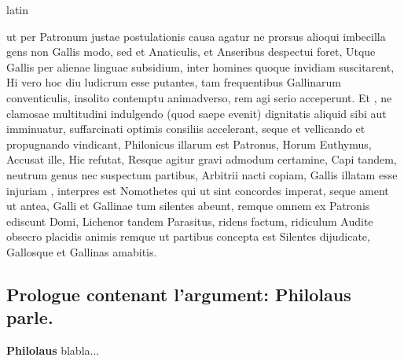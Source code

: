 \documentclass[12pt]{book}
\renewenvironment{latin}
    	{\begin{hyphenrules}{latin}}
    	{\end{hyphenrules}}
\begin{document}
\begin{pages}
\begin{latin}
\begin{Leftside}
            ut per Patronum justae postulationis causa agatur ne prorsus alioqui imbecilla gens non Gallis modo, 
            sed et Anaticulis, et Anseribus despectui foret, 
            Utque Gallis per alienae linguae subsidium, inter homines quoque invidiam suscitarent, 
            Hi vero hoc diu ludicrum esse putantes, tam frequentibus Gallinarum conventiculis, 
             insolito contemptu animadverso, rem agi serio acceperunt.  
            Et , 
            ne clamosae multitudini indulgendo (quod saepe evenit) dignitatis aliquid sibi aut  imminuatur, 
            suffarcinati optimis consiliis accelerant, seque et vellicando et propugnando vindicant, 
            Philonicus illarum  est Patronus, 
            Horum  Euthymus,  
            Accusat ille, Hic refutat,  
            Resque agitur gravi admodum certamine, 
            Capi tandem, neutrum genus nec suspectum partibus, 
            Arbitrii nacti copiam, Gallis illatam esse injuriam ,  
            interpres est Nomothetes  
            qui ut sint concordes imperat, seque ament ut antea, Galli et Gallinae tum silentes abeunt, 
            remque omnem ex Patronis ediscunt Domi,  
            Lichenor tandem Parasitus, ridens factum, ridiculum  Audite obsecro placidis animis remque 
            ut partibus concepta est Silentes dijudicate, Gallosque et Gallinas amabitis. 
                \pend 
        \endnumbering
        \end{Leftside}
        \end{latin}

        \begin{Rightside}
        \beginnumbering
            \pstart\section*{Prologue contenant l'argument: Philolaus parle.}\pend\pstart\textbf{Philolaus }\hspace{1cm} 
                        blabla...
                    \pend
        \endnumbering
        \end{Rightside}
        \end{pages}
        \Pages
        
\end{document}
